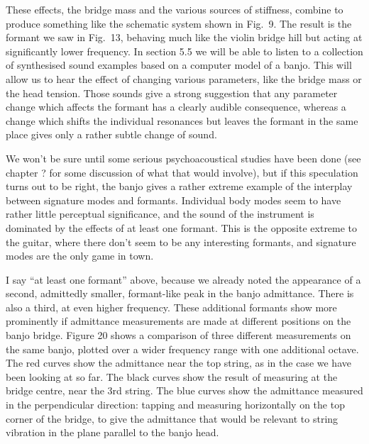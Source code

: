   These effects, the bridge mass and the various sources of stiffness, combine 
  to produce something like the schematic system shown in Fig.\ 9. The result 
  is the formant we saw in Fig.\ 13, behaving much like the violin bridge hill 
  but acting at significantly lower frequency. In section 5.5 we will be able 
  to listen to a collection of synthesised sound examples based on a computer 
  model of a banjo. This will allow us to hear the effect of changing various 
  parameters, like the bridge mass or the head tension. Those sounds give a 
  strong suggestion that any parameter change which affects the formant has a 
  clearly audible consequence, whereas a change which shifts the individual 
  resonances but leaves the formant in the same place gives only a rather 
  subtle change of sound. 

  We won't be sure until some serious psychoacoustical studies have been done 
  (see chapter ? for some discussion of what that would involve), but if this 
  speculation turns out to be right, the banjo gives a rather extreme example 
  of the interplay between signature modes and formants. Individual body modes 
  seem to have rather little perceptual significance, and the sound of the 
  instrument is dominated by the effects of at least one formant. This is the 
  opposite extreme to the guitar, where there don't seem to be any interesting 
  formants, and signature modes are the only game in town. 

  I say ``at least one formant'' above, because we already noted the appearance 
  of a second, admittedly smaller, formant-like peak in the banjo admittance. 
  There is also a third, at even higher frequency. These additional formants 
  show more prominently if admittance measurements are made at different 
  positions on the banjo bridge. Figure 20 shows a comparison of three 
  different measurements on the same banjo, plotted over a wider frequency 
  range with one additional octave. The red curves show the admittance near the 
  top string, as in the case we have been looking at so far. The black curves 
  show the result of measuring at the bridge centre, near the 3rd string. The 
  blue curves show the admittance measured in the perpendicular direction: 
  tapping and measuring horizontally on the top corner of the bridge, to give 
  the admittance that would be relevant to string vibration in the plane 
  parallel to the banjo head. 



